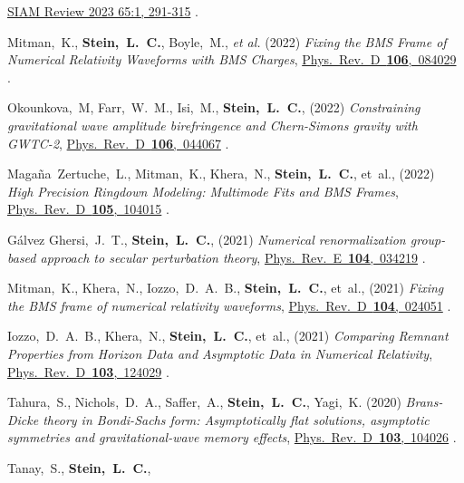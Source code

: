 \begin{etaremune}[start=\value{pubCounter}]
  \href{https://doi.org/10.1137/21M1436087}%
  {SIAM Review 2023 65:1, 291-315}
  .
\item
  Mitman,~K.,
  {\bf Stein,~L.~C.},
  Boyle,~M., {\it et al.}
  (2022)
  {\it Fixing the BMS Frame of Numerical Relativity Waveforms with BMS Charges},
  \href{https://doi.org/10.1103/PhysRevD.106.084029}%
  {Phys.~Rev.~D~{\bf 106},~084029}
  .
\item
  Okounkova,~M,
  Farr,~W.~M.,
  Isi,~M.,
  {\bf Stein,~L.~C.},
  (2022)
  {\it Constraining gravitational wave amplitude birefringence and Chern-Simons gravity with GWTC-2},
  \href{https://doi.org/10.1103/PhysRevD.106.044067}%
  {Phys.~Rev.~D~{\bf 106},~044067}
  .
\item
  Magaña~Zertuche,~L.,
  Mitman,~K.,
  Khera,~N.,
  {\bf Stein,~L.~C.},
  et~al.,
  (2022)
  {\it High Precision Ringdown Modeling: Multimode Fits and BMS Frames},
  \href{https://doi.org/10.1103/PhysRevD.105.104015}%
  {Phys.~Rev.~D~{\bf 105},~104015}
  .
\item
  Gálvez Ghersi,~J.~T.,
  {\bf Stein,~L.~C.},
  (2021)
  {\it Numerical renormalization group-based approach to secular perturbation theory},
  \href{https://doi.org/10.1103/PhysRevE.104.034219}%
  {Phys.~Rev.~E~{\bf 104},~034219}
  .
\item
  Mitman,~K.,
  Khera,~N.,
  Iozzo,~D.~A.~B.,
  {\bf Stein,~L.~C.},
  et~al.,
  (2021)
  {\it Fixing the BMS frame of numerical relativity waveforms},
  \href{https://doi.org/10.1103/PhysRevD.104.024051}%
  {Phys.~Rev.~D~{\bf 104},~024051}
  .
\item
  Iozzo,~D.~A.~B.,
  Khera,~N.,
  {\bf Stein,~L.~C.},
  et~al.,
  (2021)
  {\it Comparing Remnant Properties from Horizon Data and Asymptotic Data in Numerical Relativity},
  \href{https://doi.org/10.1103/PhysRevD.103.124029}%
  {Phys.~Rev.~D~{\bf 103},~124029}
  .
\item
  Tahura,~S.,
  Nichols,~D.~A.,
  Saffer,~A.,
  {\bf Stein,~L.~C.},
  Yagi,~K.
  (2020)
  {\it Brans-Dicke theory in Bondi-Sachs form: Asymptotically flat solutions, asymptotic symmetries and gravitational-wave memory effects},
  \href{https://doi.org/10.1103/PhysRevD.103.104026}%
  {Phys.~Rev.~D~{\bf 103},~104026}
  .
\item
  Tanay,~S.,
  {\bf Stein,~L.~C.},

\end{etaremune}
